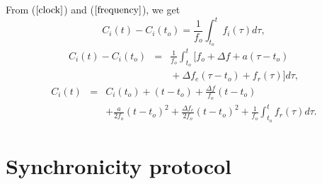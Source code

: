 \documentclass[journal]{IEEEtran}
\begin{document}
From ($\ref{clock}$) and ($\ref{frequency}$), we get
\begin{equation}
C_i(t) - C_i(t_o) = \frac{1}{f_o} \int^{t}_{t_o}f_i(\tau)d\tau ,
\end{equation}
\begin{eqnarray*}
C_i(t) - C_i(t_o) & = & \frac{1}{f_o} \int^{t}_{t_o}{[f_o + \Delta f + a(\tau-t_o)  } \\
 &  & {} + \Delta f_e(\tau-t_o) + f_r(\tau)]d\tau ,
\label{fasika}
\end{eqnarray*}
\begin{eqnarray*}
C_i(t) & = & C_i(t_o) + (t-t_o) +\frac{\Delta f}{f_o}(t-t_o) \\
& & + \frac{a}{2f_o}(t-t_o)^2 + \frac{\Delta f_e}{2f_o}(t-t_o)^2 +
\frac{1}{f_o}\int^{t}_{t_o}{f_r(\tau)d\tau} .
\end{eqnarray*}
\section{\textbf{Synchronicity protocol}}
\end{document}
